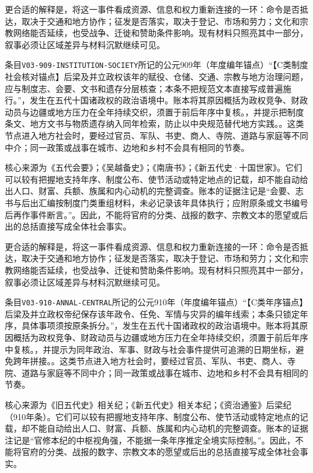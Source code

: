 更合适的解释是，将这一事件看成资源、信息和权力重新连接的一环：命令是否抵达，取决于交通和地方协作；征发是否落实，取决于登记、市场和劳力；文化和宗教网络能否延续，也受战争、迁徙和赞助条件影响。现有材料只照亮其中一部分，叙事必须让区域差异与材料沉默继续可见。

条目\texttt{V03-909-INSTITUTION-SOCIETY}所记的公元909年（年度编年锚点）“【C类制度社会核对锚点】后梁及并立政权该年的赋役、仓储、交通、宗教与地方治理问题，应与制度志、会要、文书和遗存分层核查；本条不把规范文本直接写成普遍施行。”，发生在五代十国诸政权的政治语境中。账本将其原因概括为政权竞争、财政动员与边疆或地方压力在全年持续交织，须置于前后年序中复核。，并提示把制度条文、地方文书与物质遗存纳入同年检索，防止以中央规范替代地方实践。。这类节点进入地方社会时，要经过官员、军队、书吏、商人、寺院、道路与家庭等不同中介；同一政策或战事在城市、边地和乡村不会具有相同的节奏。

核心来源为《五代会要》；《吴越备史》；《南唐书》；《新五代史·十国世家》。它们可以较有把握地支持年序、制度公布、使节活动或特定地点的记载，却不能自动给出人口、财富、兵额、族属和内心动机的完整调查。账本的证据注记是“会要、志书与后出汇编按制度门类重组材料，未必记录该年具体执行；应附原条或文书编号后再作事件断言。”。因此，不能将官府的分类、战报的数字、宗教文本的愿望或后出的总括直接写成全体社会事实。

更合适的解释是，将这一事件看成资源、信息和权力重新连接的一环：命令是否抵达，取决于交通和地方协作；征发是否落实，取决于登记、市场和劳力；文化和宗教网络能否延续，也受战争、迁徙和赞助条件影响。现有材料只照亮其中一部分，叙事必须让区域差异与材料沉默继续可见。

条目\texttt{V03-910-ANNAL-CENTRAL}所记的公元910年（年度编年锚点）“【C类年序锚点】后梁及并立政权帝纪保存该年政令、任免、军情与灾异的编年线索；本条只锁定年序，具体事项须按原条拆分。”，发生在五代十国诸政权的政治语境中。账本将其原因概括为政权竞争、财政动员与边疆或地方压力在全年持续交织，须置于前后年序中复核。，并提示为同年政治、军事、财政与社会事件提供可追溯的日期坐标，避免跨年拼接。。这类节点进入地方社会时，要经过官员、军队、书吏、商人、寺院、道路与家庭等不同中介；同一政策或战事在城市、边地和乡村不会具有相同的节奏。

核心来源为《旧五代史》相关纪；《新五代史》相关本纪；《资治通鉴》后梁纪（910年条）。它们可以较有把握地支持年序、制度公布、使节活动或特定地点的记载，却不能自动给出人口、财富、兵额、族属和内心动机的完整调查。账本的证据注记是“官修本纪的中枢视角强，不能据一条年序推定全境实际控制。”。因此，不能将官府的分类、战报的数字、宗教文本的愿望或后出的总括直接写成全体社会事实。


